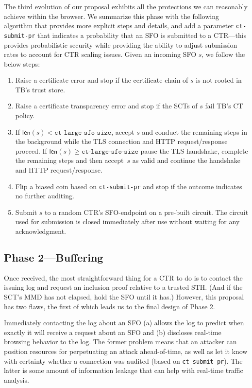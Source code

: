 The third evolution of our proposal exhibits all the protections we can reasonably achieve within the browser. We summarize this phase with the following algorithm that provides more explicit steps and details, and add a parameter \texttt{ct-submit-pr} that indicates a probability that an SFO is submitted to a CTR---this provides probabilistic security while providing the ability to adjust submission rates to account for CTR scaling issues. Given an incoming SFO $s$, we follow the below steps: %

\begin{enumerate}
    \item Raise a certificate error and stop if the certificate chain of $s$
        is not rooted in TB's trust store.
    \item Raise a certificate transparency error and stop if the SCTs of $s$
        fail TB's CT policy.
    \item If $\mathsf{len}(s) < \texttt{ct-large-sfo-size}$, accept $s$ and
        conduct the remaining steps in the background while the TLS connection
        and HTTP request/response proceed. If $\mathsf{len}(s) \geq \texttt{ct-large-sfo-size}$ pause the TLS handshake, complete the remaining steps and then
        accept~$s$ as valid and continue the handshake and HTTP request/response.
    \item Flip a biased coin based on \texttt{ct-submit-pr} and stop if the
        outcome indicates no further auditing.
    \item Submit $s$ to a random CTR's SFO-endpoint on a pre-built circuit.
        The circuit used for submission is closed immediately after use without
        waiting for any acknowledgment.
\end{enumerate}

\subsection{Phase 2---Buffering} \label{sec:base:phase2}

Once received, the most straightforward thing for a CTR to do is to contact the
issuing log and request an inclusion proof relative to a trusted STH\@. (And if the
SCT's MMD has not elapsed, hold the SFO until it has.) However, this proposal has
two flaws, the first of which leads us to the final design of Phase 2.

Immediately contacting the log about an SFO (a) allows the log to predict when exactly
it will receive a request about an SFO and (b) discloses real-time browsing behavior
to the log. The former problem means that an attacker can position resources for
perpetuating an attack ahead-of-time, as well as let it know with certainty whether a
connection was audited (based on \texttt{ct-submit-pr}). The latter is some amount
of information leakage that can help with real-time traffic analysis. 

